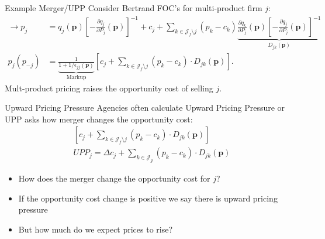 \begin{frame}{Example Merger/UPP}
\footnotesize
Consider Bertrand FOC's for multi-product firm $j$:
\begin{align*}
\label{eq:best_response}
\rightarrow \nonumber p_j &=q_{j}(\mathbf{p}) \left[-\frac{\partial q_{j}}{\partial P_{j}}(\mathbf{p})\right]^{-1} + c_{j} + \sum_{k \in \mathcal{J}_{f} \setminus j} \left(p_{k}-c_{k}\right) \underbrace{\frac{\partial q_{k}}{\partial P_{j}}(\mathbf{p})\left[-\frac{\partial q_{j}}{\partial P_{j}}(\mathbf{p})\right]^{-1}}_{D_{jk}(\mathbf{p})}\\
p_j(p_{-j}) &= \underbrace{\frac{1}{1+1/\epsilon_{jj}(\mathbf{p})}}_{\text{Markup}} \left[ c_j + \sum_{k \in \mathcal{J}_{f} \setminus j}  (p_k-c_k) \cdot  D_{jk} (\mathbf{p}) \right].
\end{align*}
Mult-product pricing \alert{raises the opportunity cost} of selling $j$.
\end{frame}

\begin{frame}{Upward Pricing Pressure}
Agencies often calculate \alert{Upward Pricing Pressure} or UPP asks how merger \alert{changes} the opportunity cost:
\begin{align*}
\left[ c_j + \sum_{k \in \mathcal{J}_{f} \setminus j}  (p_k-c_k) \cdot  D_{jk} (\mathbf{p}) \right] \\
UPP_j = \Delta c_j + \sum_{k \in \mathcal{J}_{g}}  (p_k-c_k) \cdot  D_{jk} (\mathbf{p}) 
\end{align*}
\begin{itemize}
    \item How does the merger change the \alert{opportunity cost} for $j$?
    \item If the opportunity cost change is positive we say there is \alert{upward pricing pressure}
    \item But how much do we expect prices to rise?
\end{itemize}
\end{frame}


